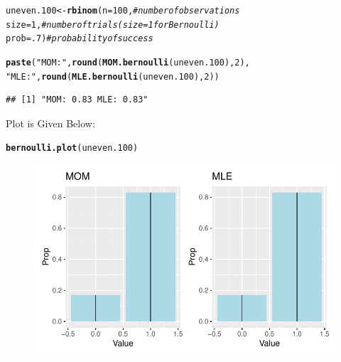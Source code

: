 \documentclass{article}\usepackage[]{graphicx}\usepackage[]{color}
\makeatletter
\def\maxwidth{ %
  \ifdim\Gin@nat@width>\linewidth
    \linewidth
  \else
    \Gin@nat@width
  \fi
}
\newcommand{\hlnum}[1]{\textcolor[rgb]{0.686,0.059,0.569}{#1}}%
\newcommand{\hlstr}[1]{\textcolor[rgb]{0.192,0.494,0.8}{#1}}%
\newcommand{\hlcom}[1]{\textcolor[rgb]{0.678,0.584,0.686}{\textit{#1}}}%
\newcommand{\hlstd}[1]{\textcolor[rgb]{0.345,0.345,0.345}{#1}}%
\newcommand{\hlkwb}[1]{\textcolor[rgb]{0.69,0.353,0.396}{#1}}%
\newcommand{\hlkwc}[1]{\textcolor[rgb]{0.333,0.667,0.333}{#1}}%
\newcommand{\hlkwd}[1]{\textcolor[rgb]{0.737,0.353,0.396}{\textbf{#1}}}%
\newenvironment{kframe}{%
 \def\at@end@of@kframe{}%
 \ifinner\ifhmode%
  \def\at@end@of@kframe{\end{minipage}}%
  \begin{minipage}{\columnwidth}%
 \fi\fi%
 \def\FrameCommand##1{\hskip\@totalleftmargin \hskip-\fboxsep
 \colorbox{shadecolor}{##1}\hskip-\fboxsep
     \hskip-\linewidth \hskip-\@totalleftmargin \hskip\columnwidth}%
 \MakeFramed {\advance\hsize-\width
   \@totalleftmargin\z@ \linewidth\hsize
   \@setminipage}}%
 {\par\unskip\endMakeFramed%
 \at@end@of@kframe}
\newenvironment{knitrout}{}{} %
\makeatother
\begin{document}
\begin{enumerate}
\begin{enumerate}
\begin{knitrout}
\color{fgcolor}\begin{kframe}
\begin{alltt}
\hlstd{uneven.100} \hlkwb{<-} \hlkwd{rbinom}\hlstd{(}\hlkwc{n}\hlstd{=}\hlnum{100}\hlstd{,}        \hlcom{#number of observations}
                    \hlkwc{size}\hlstd{=}\hlnum{1}\hlstd{,}        \hlcom{#number of trials (size=1 for Bernoulli)}
                    \hlkwc{prob}\hlstd{=}\hlnum{.7}\hlstd{)}       \hlcom{#probability of success}

\hlkwd{paste}\hlstd{(}\hlstr{"MOM:"}\hlstd{,} \hlkwd{round}\hlstd{(}\hlkwd{MOM.bernoulli}\hlstd{(uneven.100),}\hlnum{2}\hlstd{),}
      \hlstr{"MLE:"}\hlstd{,} \hlkwd{round}\hlstd{(}\hlkwd{MLE.bernoulli}\hlstd{(uneven.100),} \hlnum{2}\hlstd{))}
\end{alltt}
\begin{verbatim}
## [1] "MOM: 0.83 MLE: 0.83"
\end{verbatim}
\end{kframe}
\end{knitrout}
Plot is Given Below:
\begin{knitrout}
\color{fgcolor}\begin{kframe}
\begin{alltt}
\hlkwd{bernoulli.plot}\hlstd{(uneven.100)}
\end{alltt}
\end{kframe}
\end{knitrout}
\begin{figure}[H]
  \begin{center}
\begin{knitrout}
\color{fgcolor}
\includegraphics[width=\maxwidth]{figure/unnamed-chunk-59-1} 

\end{knitrout}
\end{center}
\end{figure}
\end{enumerate}
\end{enumerate}
\end{document}
